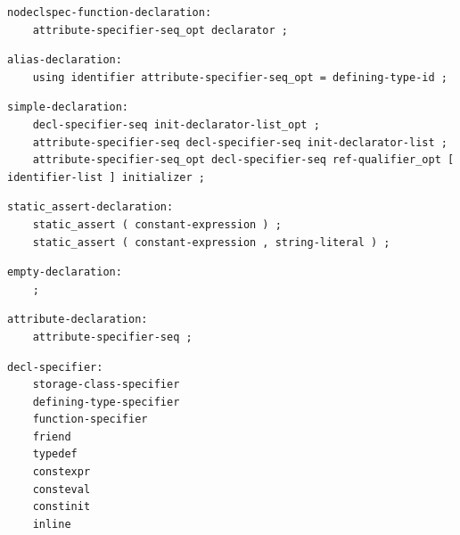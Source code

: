 \noindent\textbf{\texttt{}}\par
\begin{lstlisting}
nodeclspec-function-declaration:
    attribute-specifier-seq_opt declarator ;
\end{lstlisting}

\noindent\textbf{\texttt{}}\par
\begin{lstlisting}
alias-declaration:
    using identifier attribute-specifier-seq_opt = defining-type-id ;
\end{lstlisting}

\noindent\textbf{\texttt{}}\par
\begin{lstlisting}
simple-declaration:
    decl-specifier-seq init-declarator-list_opt ;
    attribute-specifier-seq decl-specifier-seq init-declarator-list ;
    attribute-specifier-seq_opt decl-specifier-seq ref-qualifier_opt [ identifier-list ] initializer ;
\end{lstlisting}

\noindent\textbf{\texttt{}}\par
\begin{lstlisting}
static_assert-declaration:
    static_assert ( constant-expression ) ;
    static_assert ( constant-expression , string-literal ) ;
\end{lstlisting}

\noindent\textbf{\texttt{}}\par
\begin{lstlisting}
empty-declaration:
    ;
\end{lstlisting}

\noindent\textbf{\texttt{}}\par
\begin{lstlisting}
attribute-declaration:
    attribute-specifier-seq ;
\end{lstlisting}

\noindent\textbf{\texttt{}}\par
\begin{lstlisting}
decl-specifier:
    storage-class-specifier
    defining-type-specifier
    function-specifier
    friend
    typedef
    constexpr
    consteval
    constinit
    inline
\end{lstlisting}

